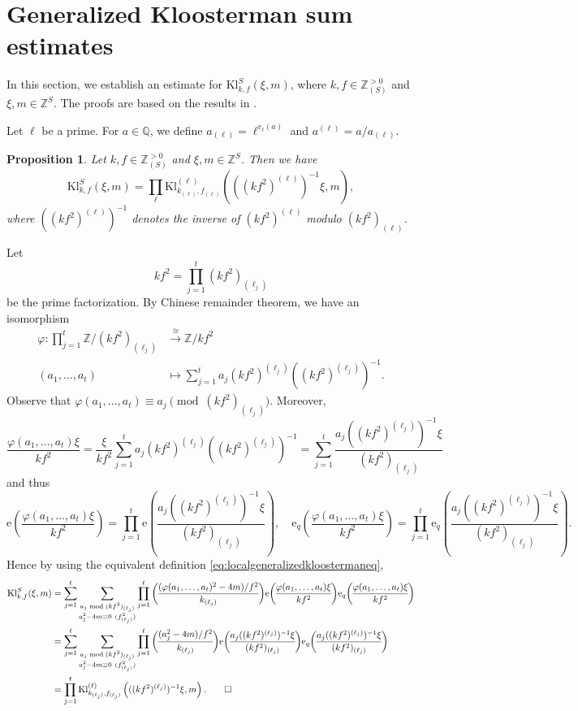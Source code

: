 \documentclass[10pt,oneside,reqno]{amsart}
\makeatletter
\newcommand\rme{\mathrm{e}}
\newcommand\QQ{\mathbb{Q}}
\newcommand\ZZ{\mathbb{Z}}
\newcommand\Kl{\mathrm{Kl}}
\newcommand\legendresymbol[2]{\genfrac{(}{)}{}{}{#1}{#2}}
\theoremstyle{THEOREM}
\newtheorem{proposition}[theorem]{Proposition}
\theoremstyle{DEFINITION}
\theoremstyle{EXERCISE}
\numberwithin{equation}{section}
\renewenvironment{proof}[1][\proofname]{\par
  \vspace{-6pt}
  \pushQED{\qed}
  \normalfont \topsep6\p@\@plus6\p@\relax
  \trivlist
  \item[\hskip\labelsep\rmfamily\bfseries
    #1\@addpunct{:}]\ignorespaces
}{
  \popQED\endtrivlist\@endpefalse
  \vspace{-6pt}
}
\makeatother
\begin{document}
\section{Generalized Kloosterman sum estimates}\label{sec:kloosterman}
In this section, we establish an estimate for $\Kl_{k,f}^S(\xi,m)$, where $k,f\in \ZZ_{(S)}^{>0}$ and $\xi,m\in \ZZ^S$.
The proofs are based on the results in \cite[Appendix B]{altug2017}.

Let $\ell$ be a prime. For $a\in\QQ$, we define $a_{(\ell)}=\ell^{v_\ell(a)}$ and  $a^{(\ell)}=a/a_{(\ell)}$.

\begin{proposition}\label{prop:prodkloostermanlocal}
Let $k,f\in \ZZ_{(S)}^{>0}$ and $\xi,m\in \ZZ^S$. Then we have
\[
\Kl_{k,f}^S(\xi,m)=\prod_{\ell}\Kl_{k_{(\ell)},f_{(\ell)}}^{(\ell)}\left(((kf^2)^{(\ell)})^{-1}\xi,m\right),
\]
where $((kf^2)^{(\ell)})^{-1}$ denotes the inverse of $(kf^2)^{(\ell)}$ modulo $(kf^2)_{(\ell)}$.
\end{proposition}
\begin{proof}
Let
\[
kf^2=\prod_{j=1}^{t}(kf^2)_{(\ell_j)}
\]
be the prime factorization. By Chinese remainder theorem, we have an isomorphism
\[
\begin{split}
   \varphi: \prod_{j=1}^{t}\ZZ/(kf^2)_{(\ell_j)} &\xrightarrow{\cong} \ZZ/kf^2 \\
     (a_1,\dots,a_t) &\mapsto \sum_{j=1}^{t} a_j(kf^2)^{(\ell_j)}((kf^2)^{(\ell_j)})^{-1}.
\end{split}
\]
Observe that $\varphi(a_1,\dots,a_t)\equiv a_j\pmod{(kf^2)_{(\ell_j)}}$. Moreover, 
\[
\frac{\varphi(a_1,\dots,a_t)\xi}{kf^2}=\frac{\xi}{kf^2}\sum_{j=1}^{t} a_j(kf^2)^{(\ell_j)}((kf^2)^{(\ell_j)})^{-1}=\sum_{j=1}^{t} \frac{a_j((kf^2)^{(\ell_j)})^{-1}\xi}{(kf^2)_{(\ell_j)}}
\]
and thus
\[
\rme\legendresymbol{\varphi(a_1,\dots,a_t)\xi}{kf^2}=\prod_{j=1}^{t} \rme\legendresymbol{a_j((kf^2)^{(\ell_j)})^{-1}\xi}{(kf^2)_{(\ell_j)}},\quad \rme_q\legendresymbol{\varphi(a_1,\dots,a_t)\xi}{kf^2}=\prod_{j=1}^{t} \rme_q\legendresymbol{a_j((kf^2)^{(\ell_j)})^{-1}\xi}{(kf^2)_{(\ell_j)}}.
\]
Hence by using the equivalent definition \eqref{eq:localgeneralizedkloostermaneq},
\begin{align*}
  \Kl_{k,f}^S(\xi,m) & =\sum_{j=1}^{t}\sum_{\substack{a_j \bmod (kf^2)_{(\ell_j)}\\ a_j^2-4m\equiv 0 \ (f_{(\ell_j)}^2)}}\prod_{j=1}^{t}\legendresymbol{(\varphi(a_1,\dots,a_t)^2-4m)/f^2}{k_{(\ell_j)}} \rme\legendresymbol{\varphi(a_1,\dots,a_t)\xi}{kf^2}\rme_{q} \legendresymbol{\varphi(a_1,\dots,a_t)\xi}{kf^2} \\
   & =\sum_{j=1}^{t}\sum_{\substack{a_j \bmod (kf^2)_{(\ell_j)}\\ a_j^2-4m\equiv 0 \ (f_{(\ell_j)}^2)}}\prod_{j=1}^{t}\legendresymbol{(a_j^2-4m)/f^2}{k_{(\ell_j)}} \rme\legendresymbol{a_j((kf^2)^{(\ell_j)})^{-1}\xi}{(kf^2)_{(\ell_j)}} \rme_q\legendresymbol{a_j((kf^2)^{(\ell_j)})^{-1}\xi}{(kf^2)_{(\ell_j)}}\\
   & = \prod_{j=1}^{t}\Kl_{k_{(\ell_j)},f_{(\ell_j)}}^{(\ell)}\left(((kf^2)^{(\ell_j)})^{-1}\xi,m\right).\qedhere
\end{align*}
\end{proof}
\end{document}
